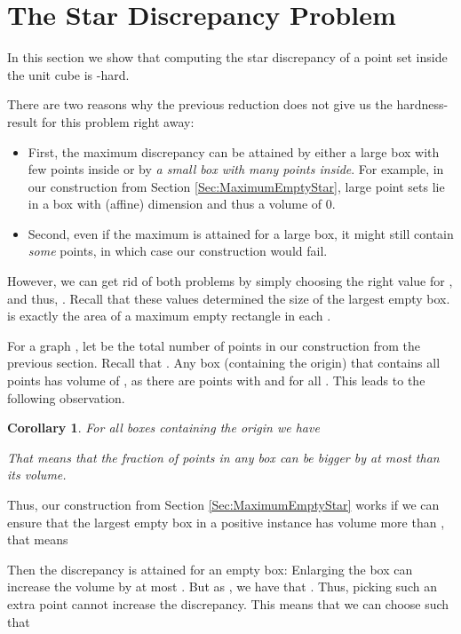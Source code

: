 \documentclass[12pt]{article}
\newtheorem{corollary}{Corollary}
\begin{document}
\section{The Star Discrepancy Problem}\label{Sec:StarDiscrepancy}

In this section we show that computing the star discrepancy of a point set
inside the unit cube is -hard.

There are two reasons why the previous reduction does not give us the hardness-result for this problem right away: 
\begin{itemize}
	\item 	First, the maximum discrepancy can be
			attained by either a large box with few points inside or by \emph{a small box
			with many points inside}. For example, in our construction from Section \ref{Sec:MaximumEmptyStar}, large point 				sets lie in a box with (affine) dimension  and thus a volume of 0. 

	\item 	Second, even if the maximum is attained for a large box, it might still contain \emph{some}
			points, in which case our construction would fail. 
\end{itemize}
However, we can get rid of
both problems by simply choosing the right value for , and thus, . Recall that these values determined the size of the largest empty box.  is exactly the area of a maximum empty rectangle in each .

For a graph , let  be the total number of points in our construction
from the previous section. Recall that . Any
box (containing the origin) that contains all points has volume of , as there are points
with  and  for all . This leads to the following observation.
\begin{corollary}\label{Cor:MaxPointDis} For all boxes  containing the origin we have 

That means that the fraction of points in any box can be bigger by at most  than its volume.
\end{corollary}

Thus, our construction from Section \ref{Sec:MaximumEmptyStar} works if we can ensure that the largest empty box in a positive instance has volume more than , that means 
 
Then the discrepancy is attained for an empty box: Enlarging the box can increase the volume by at most . But as , we have that . Thus, picking such an extra point cannot increase the discrepancy. This means that we can choose  such that
\end{document}
